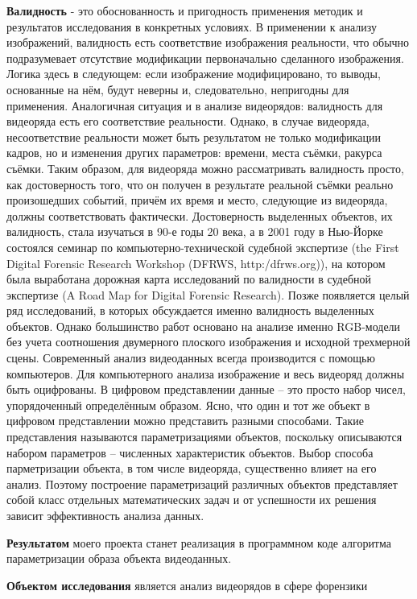 \documentclass[]{article}
\begin{document}
\textbf{Валидность} - это обоснованность и пригодность применения методик и результатов исследования в конкретных условиях. В применении к анализу изображений, валидность есть соответствие изображения реальности, что обычно подразумевает отсутствие модификации первоначально сделанного изображения. Логика здесь в следующем: если изображение модифицировано, то выводы, основанные на нём, будут неверны и, следовательно, непригодны для применения. Аналогичная ситуация и в анализе видеорядов: валидность для видеоряда есть его соответствие реальности. Однако, в случае видеоряда, несоответствие реальности может быть результатом не только модификации кадров, но и изменения других параметров: времени, места съёмки, ракурса съёмки. Таким образом, для видеоряда можно рассматривать валидность просто, как достоверность того, что он получен в результате реальной съёмки реально произошедших событий, причём их время и место, следующие из видеоряда, должны соответствовать фактически.
Достоверность выделенных объектов, их валидность, стала изучаться в 90-е годы 20 века, а в 2001 году в Нью-Йорке состоялся семинар по компьютерно-технической судебной экспертизе (the First Digital Forensic Research Workshop (DFRWS, http:/dfrws.org)), на котором была выработана дорожная карта исследований по валидности в судебной экспертизе (A Road Map for Digital Forensic Research). Позже появляется целый ряд исследований, в которых обсуждается именно валидность выделенных объектов. Однако большинство работ основано на анализе именно RGB-модели без учета соотношения двумерного плоского изображения и исходной трехмерной сцены.
Современный анализ видеоданных всегда производится с помощью компьютеров. Для компьютерного анализа изображение и весь видеоряд должны быть оцифрованы. В цифровом представлении данные – это просто набор чисел, упорядоченный определённым образом. Ясно, что один и тот же объект в цифровом представлении можно представить разными способами. Такие представления называются параметризациями объектов, поскольку описываются набором параметров – численных характеристик объектов. Выбор способа парметризации объекта, в том числе видеоряда, существенно влияет на его анализ. Поэтому построение параметризаций различных объектов представляет собой класс отдельных математических задач и от успешности их решения зависит эффективность анализа данных. 

\textbf{Результатом} моего проекта станет реализация в программном коде алгоритма параметризации образа объекта видеоданных.

\textbf{Объектом исследования} является анализ видеорядов в сфере форензики
\end{document}
